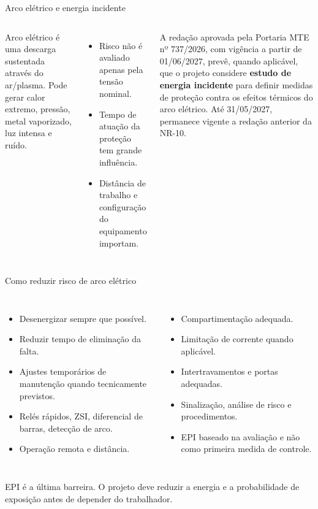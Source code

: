 \begin{frame}{Arco elétrico e energia incidente}
\small
\begin{columns}[T,onlytextwidth]
\begin{caixaDef}
Arco elétrico é uma descarga sustentada através do ar/plasma. Pode gerar calor extremo, pressão, metal vaporizado, luz intensa e ruído.
\end{caixaDef}
\begin{itemize}
\item Risco não é avaliado apenas pela tensão nominal.
\item Tempo de atuação da proteção tem grande influência.
\item Distância de trabalho e configuração do equipamento importam.
\end{itemize}
\begin{caixaNorma}[title=NR-10 futura --- vigência em 01/06/2027]
A redação aprovada pela Portaria MTE nº 737/2026, com vigência a partir de 01/06/2027, prevê, quando aplicável, que o projeto considere \textbf{estudo de energia incidente} para definir medidas de proteção contra os efeitos térmicos do arco elétrico. Até 31/05/2027, permanece vigente a redação anterior da NR-10.
\end{caixaNorma}
\end{columns}
\end{frame}

\begin{frame}{Como reduzir risco de arco elétrico}
\small
\begin{columns}[T,onlytextwidth]
\begin{itemize}
\item Desenergizar sempre que possível.
\item Reduzir tempo de eliminação da falta.
\item Ajustes temporários de manutenção quando tecnicamente previstos.
\item Relés rápidos, ZSI, diferencial de barras, detecção de arco.
\item Operação remota e distância.
\end{itemize}
\begin{itemize}
\item Compartimentação adequada.
\item Limitação de corrente quando aplicável.
\item Intertravamentos e portas adequadas.
\item Sinalização, análise de risco e procedimentos.
\item EPI baseado na avaliação e não como primeira medida de controle.
\end{itemize}
\end{columns}
\begin{caixaAt}
EPI é a última barreira. O projeto deve reduzir a energia e a probabilidade de exposição antes de depender do trabalhador.
\end{caixaAt}
\end{frame}

